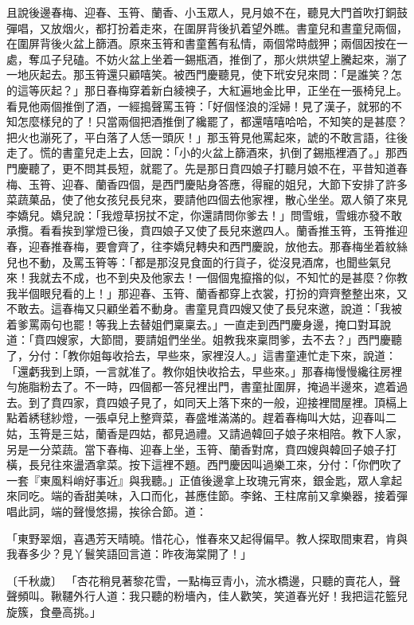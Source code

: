 且說後邊春梅、迎春、玉筲、蘭香、小玉眾人，見月娘不在，聽見大門首吹打銅鼓彈唱，又放烟火，都打扮着走來，在圍屏背後扒着望外瞧。書童兒和晝童兒兩個，在圍屏背後火盆上篩酒。原來玉筲和書童舊有私情，兩個常時戲狎；兩個因按在一處，奪瓜子兒磕。不妨火盆上坐着一錫瓶酒，推倒了，那火烘烘望上騰起來，漰了一地灰起去。那玉筲還只顧嘻笑。被西門慶聽見，使下玳安兒來問：「是誰笑？怎的這等灰起？」那日春梅穿着新白綾襖子，大紅遍地金比甲，正坐在一張椅兒上。看見他兩個推倒了酒，一經搗聲罵玉筲：「好個怪浪的淫婦！見了漢子，就邪的不知怎麼樣兒的了！只當兩個把酒推倒了纔罷了，都還嘻嘻哈哈，不知笑的是甚麼？把火也漰死了，平白落了人恁一頭灰！」那玉筲見他罵起來，諕的不敢言語，往後走了。慌的書童兒走上去，回說：「小的火盆上篩酒來，扒倒了錫瓶裡酒了。」那西門慶聽了，更不問其長短，就罷了。先是那日賁四娘子打聽月娘不在，平昔知道春梅、玉筲、迎春、蘭香四個，是西門慶貼身答應，得寵的姐兒，大節下安排了許多菜蔬菓品，使了他女孩兒長兒來，要請他四個去他家裡，散心坐坐。眾人領了來見李嬌兒。嬌兒說：「我燈草拐扙不定，你還請問你爹去！」問雪蛾，雪蛾亦發不敢承攬。看看挨到掌燈已後，賁四娘子又使了長兒來邀四人。蘭香推玉筲，玉筲推迎春，迎春推春梅，要會齊了，往李嬌兒轉央和西門慶說，放他去。那春梅坐着紋絲兒也不動，及罵玉筲等：「都是那沒見食面的行貨子，從沒見酒席，也聞些氣兒來！我就去不成，也不到央及他家去！一個個鬼攛揝的似，不知忙的是甚麼？你教我半個眼兒看的上！」那迎春、玉筲、蘭香都穿上衣裳，打扮的齊齊整整出來，又不敢去。這春梅又只顧坐着不動身。書童見賁四嫂又使了長兒來邀，說道：「我被着爹罵兩句也罷！等我上去替姐們稟稟去。」一直走到西門慶身邊，掩口對耳說道：「賁四嫂家，大節間，要請姐們坐坐。姐教我來稟問爹，去不去？」西門慶聽了，分付：「教你姐每收拾去，早些來，家裡沒人。」這書童連忙走下來，說道：「還虧我到上頭，一言就准了。教你姐快收拾去，早些來。」那春梅慢慢纔往房裡勻施脂粉去了。不一時，四個都一答兒裡出門，書童扯圍屏，掩過半邊來，遮着過去。到了賁四家，賁四娘子見了，如同天上落下來的一般，迎接裡間屋裡。頂槅上點着綉毬紗燈，一張卓兒上整齊菜，春盛堆滿滿的。趕着春梅叫大姑，迎春叫二姑，玉筲是三姑，蘭香是四姑，都見過禮。又請過韓回子娘子來相陪。教下人家，另是一分菜蔬。當下春梅、迎春上坐，玉筲、蘭香對席，賁四嫂與韓回子娘子打橫，長兒往來盪酒拿菜。按下這裡不題。西門慶因叫過樂工來，分付：「你們吹了一套『東風料峭好事近』與我聽。」正值後邊拿上玫瑰元宵來，銀金匙，眾人拿起來同吃。端的香甜美味，入口而化，甚應佳節。李銘、王柱席前又拿樂器，接着彈唱此詞，端的聲慢悠揚，挨徐合節。道：

「東野翠烟，喜遇芳天晴曉。惜花心，惟春來又起得偏早。教人探取間東君，肯與我春多少？見丫鬟笑語回言道：昨夜海棠開了！」

〔千秋歲〕  「杏花稍見著黎花雪，一點梅豆青小，流水橋邊，只聽的賣花人，聲聲頻叫。鞦韆外行人道：我只聽的粉墻內，佳人歡笑，笑道春光好！我把這花籃兒旋簇，食壘高挑。」

